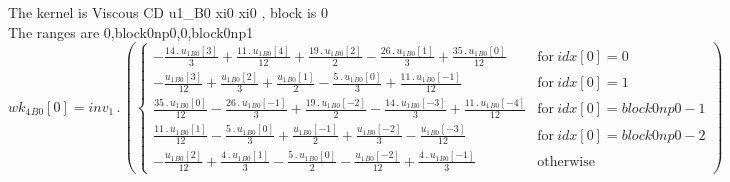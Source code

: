 \documentclass{article}
\begin{document}
\noindent The kernel is Viscous CD u1_B0 xi0 xi0 , block is 0\\\noindent The ranges are 0,block0np0,0,block0np1\\\begin{dmath}{wk_{4}{_{B0}}}[{0}] = inv_1 \,.\, \left(\begin{cases} - \frac{14 \,.\, {u_{1}{_{B0}}}[{3}]}{3} + \frac{11 \,.\, {u_{1}{_{B0}}}[{4}]}{12} + \frac{19 \,.\, {u_{1}{_{B0}}}[{2}]}{2} - \frac{26 \,.\, {u_{1}{_{B0}}}[{1}]}{3} + \frac{35 \,.\, 
{u_{1}{_{B0}}}[{0}]}{12} & \text{for}\: {idx}[{0}] = 0 \\- \frac{{u_{1}{_{B0}}}[{3}]}{12} + \frac{{u_{1}{_{B0}}}[{2}]}{3} + \frac{{u_{1}{_{B0}}}[{1}]}{2} - \frac{5 \,.\, {u_{1}{_{B0}}}[{0}]}{3} + \frac{11 \,.\, {u_{1}{_{B0}}}[{-1}]}{12} & 
\text{for}\: {idx}[{0}] = 1 \\\frac{35 \,.\, {u_{1}{_{B0}}}[{0}]}{12} - \frac{26 \,.\, {u_{1}{_{B0}}}[{-1}]}{3} + \frac{19 \,.\, {u_{1}{_{B0}}}[{-2}]}{2} - \frac{14 \,.\, {u_{1}{_{B0}}}[{-3}]}{3} + \frac{11 \,.\, {u_{1}{_{B0}}}[{-4}]}{12} & 
\text{for}\: {idx}[{0}] = block0np0 - 1 \\\frac{11 \,.\, {u_{1}{_{B0}}}[{1}]}{12} - \frac{5 \,.\, {u_{1}{_{B0}}}[{0}]}{3} + \frac{{u_{1}{_{B0}}}[{-1}]}{2} + \frac{{u_{1}{_{B0}}}[{-2}]}{3} - \frac{{u_{1}{_{B0}}}[{-3}]}{12} & \text{for}\: {idx}[{0}] = 
block0np0 - 2 \\- \frac{{u_{1}{_{B0}}}[{2}]}{12} + \frac{4 \,.\, {u_{1}{_{B0}}}[{1}]}{3} - \frac{5 \,.\, {u_{1}{_{B0}}}[{0}]}{2} - \frac{{u_{1}{_{B0}}}[{-2}]}{12} + \frac{4 \,.\, {u_{1}{_{B0}}}[{-1}]}{3} & \text{otherwise} 
\end{cases}\right)\end{dmath}
\end{document}
